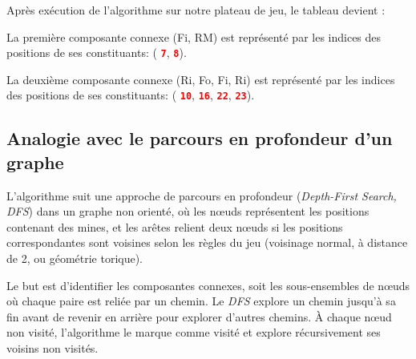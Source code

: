 \documentclass[a4paper,12pt]{report}
\begin{document}
Après exécution de l'algorithme sur notre plateau de jeu, le tableau devient :

\begin{center}
\end{center}

La première composante connexe (Fi, RM) est représenté par les indices des positions de ses constituants: 
(\textcolor{red}{ \textbf{\texttt{7}}}, \textcolor{red}{ \textbf{\texttt{8}}}).

La deuxième composante connexe (Ri, Fo, Fi, Ri) est représenté par les indices des positions de ses constituants: 
(\textcolor{red}{ \textbf{\texttt{10}}}, \textcolor{red}{ \textbf{\texttt{16}}}, \textcolor{red}{ \textbf{\texttt{22}}}, \textcolor{red}{ \textbf{\texttt{23}}}).

\subsection{Analogie avec le parcours en profondeur d'un graphe}

L'algorithme suit une approche de parcours en profondeur (\textit{Depth-First Search, DFS}) dans un graphe non orienté, où les nœuds représentent les positions contenant des 
mines, et les arêtes relient deux nœuds si les positions correspondantes sont voisines selon les règles du jeu (voisinage normal, à distance de 2, ou 
géométrie torique).

Le but est d'identifier les composantes connexes, soit les sous-ensembles de nœuds où chaque paire est reliée par un chemin. Le \textit{DFS} explore un 
chemin jusqu'à sa fin avant de revenir en arrière pour explorer d'autres chemins. À chaque nœud non visité, l'algorithme le marque comme visité et explore 
récursivement ses voisins non visités.
\end{document}
